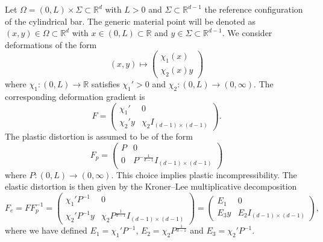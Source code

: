 \documentclass[a4paper,10pt,oneside]{amsbook}
\numberwithin{section}{chapter}
\numberwithin{equation}{chapter}
\theoremstyle{definition}
\begin{document}
Let $\Omega=(0,L)\times\Sigma\subset\mathbb{R}^d$ with $L>0$ and $\Sigma\subset\mathbb{R}^{d-1}$ the reference configuration of the cylindrical bar. The generic material point will be denoted as $(x,y)\in\Omega\subset\mathbb{R}^d$ with $x\in(0,L)\subset\mathbb{R}$ and $y\in\Sigma\subset\mathbb{R}^{d-1}$. We consider deformations of the form
\begin{equation}
\label{eqn:necking-large:deformation}
(x,y)\mapsto\begin{pmatrix}
\chi_1(x) \\
\chi_2(x)y
\end{pmatrix}
\end{equation}
where $\chi_1\colon(0,L)\to\mathbb{R}$ satisfies $\chi_1'>0$ and $\chi_2\colon(0,L)\to(0,\infty)$. The corresponding deformation gradient is
\[
F=\begin{pmatrix}
\chi_1' & 0 \\
\chi_2'y & \chi_2I_{(d-1)\times(d-1)}
\end{pmatrix}.
\]
The plastic distortion is assumed to be of the form
\begin{equation}
\label{eqn:necking-large:plastic}
F_p=\begin{pmatrix}
P & 0 \\
0 & P^{-\frac{1}{d-1}}I_{(d-1)\times(d-1)}
\end{pmatrix}
\end{equation}
where $P\colon(0,L)\to(0,\infty)$. This choice implies plastic incompressibility. The elastic distortion is then given by the Kroner--Lee multiplicative decomposition
\[
F_e=FF_p^{-1}=\begin{pmatrix}
\chi_1'P^{-1} & 0 \\
\chi_2'P^{-1}y & \chi_2P^\frac{1}{d-1}I_{(d-1)\times(d-1)}
\end{pmatrix}=
\begin{pmatrix}
E_1 & 0 \\
E_3y & E_2I_{(d-1)\times(d-1)}
\end{pmatrix},
\]
where we have defined $E_1=\chi_1'P^{-1}$, $E_2=\chi_2P^{\frac{1}{d-1}}$ and $E_3=\chi_2'P^{-1}$.
\end{document}

